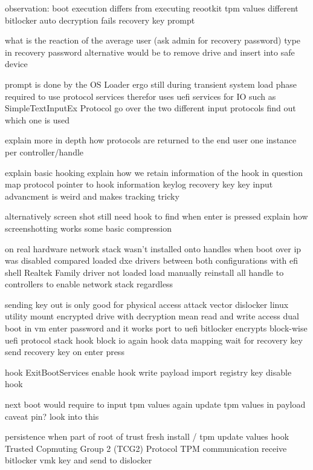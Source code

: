 observation:
boot execution differs from executing reootkit
tpm values different
bitlocker auto decryption fails
recovery key prompt

what is the reaction of the average user
(ask admin for recovery password)
type in recovery password
alternative would be to remove drive and insert into safe device

prompt is done by the OS Loader
ergo still during transient system load phase
required to use protocol services
therefor uses uefi services for IO
such as SimpleTextInputEx Protocol
go over the two different input protocols
find out which one is used

explain more in depth how protocols are returned to the end user
one instance per controller/handle

explain basic hooking
explain how we retain information of the hook in question
map protocol pointer to hook information
keylog recovery key
key input advancment is weird and makes tracking tricky

alternatively screen shot
still need hook to find when enter is pressed
explain how screenshotting works
some basic compression

on real hardware
network stack wasn't installed onto handles when boot over ip was disabled
compared loaded dxe drivers between both configurations with efi shell
Realtek Family driver not loaded
load manually
reinstall all handle to controllers to enable network stack regardless

sending key out is only good for physical access attack vector
dislocker linux utility
mount encrypted drive with decryption mean
read and write access
dual boot in vm
enter password and it works
port to uefi
bitlocker encrypts block-wise
uefi protocol stack
hook block io
again hook data mapping
wait for recovery key
send recovery key on enter press

hook ExitBootServices
enable hook
write payload
import registry key
disable hook

next boot would require to input tpm values again
update tpm values in payload
caveat pin? look into this

persistence when part of root of trust
fresh install / tpm update values
hook Trusted Copmuting Group 2 (TCG2) Protocol
TPM communication
receive bitlocker vmk key and send to dislocker